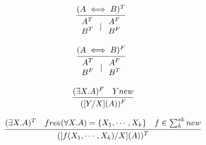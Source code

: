 \begin{multicols}{2}
    \noindent
    \begin{minipage}{\linewidth}
        \[
            \infer[]{
                \begin{array}{c} A^T \\ B^T \end{array}
                \mid
                \begin{array}{c} A^F \\ B^F \end{array}
            }{(A \iff B)^T}
        \]
    \end{minipage}

    \noindent
    \begin{minipage}{\linewidth}
        \[
            \infer[]{
                \begin{array}{c} A^T \\ B^F \end{array}
                \mid
                \begin{array}{c} A^F \\ B^T \end{array}
            }{(A \iff B)^F}
        \]
    \end{minipage}
\end{multicols}

\begin{multicols}{2}
    \noindent
    \begin{minipage}{\linewidth}
        \[
            \infer{([Y/X](A))^F}{(\exists X.A)^F \quad Y new}
        \]
    \end{minipage}

    \noindent
    \begin{minipage}{\linewidth}
        \[
            \infer{([f(X_1,\cdots,X_k)/X](A))^T}{
                (\exists X.A)^T \quad
                free(\forall X.A) = \{X_1,\cdots,X_k\} \quad
                f \in \sum_{k}^{sk} new
            }
        \]
    \end{minipage}
\end{multicols}